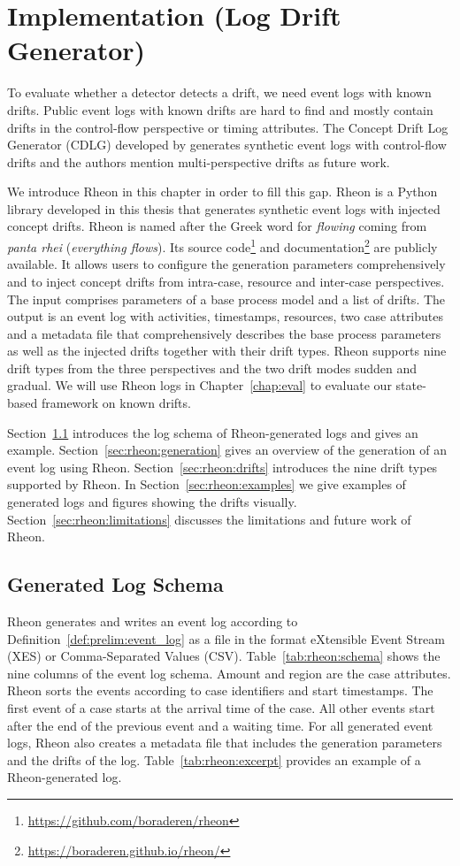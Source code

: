 \chapter{Implementation (Log Drift Generator)}
\label{chap:rheon}

To evaluate whether a detector detects a drift, we need event logs with known drifts. Public event logs with known drifts are hard to find and mostly contain drifts in the control-flow perspective or timing attributes. The Concept Drift Log Generator (CDLG) developed by \textcite{grimm2022cdlg} generates synthetic event logs with control-flow drifts and the authors mention multi-perspective drifts as future work.

We introduce Rheon in this chapter in order to fill this gap. Rheon is a Python library developed in this thesis that generates synthetic event logs with injected concept drifts. Rheon is named after the Greek word for \emph{flowing} coming from \emph{panta rhei} (\emph{everything flows}). Its source code\footnote{\url{https://github.com/boraderen/rheon}} and documentation\footnote{\url{https://boraderen.github.io/rheon/}} are publicly available. It allows users to configure the generation parameters comprehensively and to inject concept drifts from intra-case, resource and inter-case perspectives. The input comprises parameters of a base process model and a list of drifts. The output is an event log with activities, timestamps, resources, two case attributes and a metadata file that comprehensively describes the base process parameters as well as the injected drifts together with their drift types. Rheon supports nine drift types from the three perspectives and the two drift modes sudden and gradual. We will use Rheon logs in Chapter~\ref{chap:eval} to evaluate our state-based framework on known drifts.

Section~\ref{sec:rheon:schema} introduces the log schema of Rheon-generated logs and gives an example. Section~\ref{sec:rheon:generation} gives an overview of the generation of an event log using Rheon. Section~\ref{sec:rheon:drifts} introduces the nine drift types supported by Rheon. In Section~\ref{sec:rheon:examples} we give examples of generated logs and figures showing the drifts visually. Section~\ref{sec:rheon:limitations} discusses the limitations and future work of Rheon.


\section{Generated Log Schema}
\label{sec:rheon:schema}
Rheon generates and writes an event log according to Definition~\ref{def:prelim:event_log} as a file in the format eXtensible Event Stream (XES) or Comma-Separated Values (CSV). Table~\ref{tab:rheon:schema} shows the nine columns of the event log schema. Amount and region are the case attributes. Rheon sorts the events according to case identifiers and start timestamps. The first event of a case starts at the arrival time of the case. All other events start after the end of the previous event and a waiting time. For all generated event logs, Rheon also creates a metadata file that includes the generation parameters and the drifts of the log. Table~\ref{tab:rheon:excerpt} provides an example of a Rheon-generated log.

